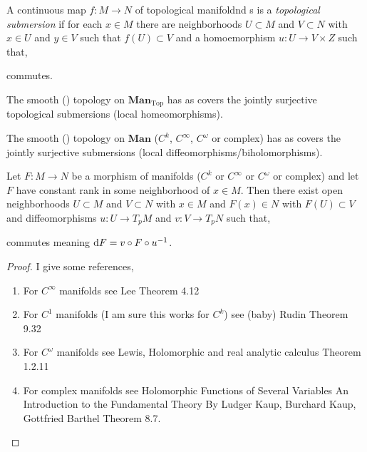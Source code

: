 \documentclass[12pt]{article}
\begin{document}
\begin{defn}
A continuous map $f : M \to N$ of topological manifoldnd s is a \textit{topological submersion} if for each $x \in M$ there are neighborhoods $U \subset M$ and $V \subset N$ with $x \in U$ and $y \in V$ such that $f(U) \subset V$ and a homoemorphism $u : U \to V \times Z$ such that,
\begin{center}
\end{center}
commutes.
\end{defn}

\begin{defn}
The smooth (\etale) topology on $\mathbf{Man}_{\mathrm{Top}}$ has as covers the jointly surjective topological submersions (local homeomorphisms). 
\end{defn}

\begin{defn}
The smooth (\etale) topology on $\mathbf{Man}$ ($C^k$, $C^\infty$, $C^\omega$ or complex) has as covers the jointly surjective submersions (local diffeomorphisms/biholomorphisms). 
\end{defn}

\begin{theorem}
Let $F : M \to N$ be a morphism of manifolds ($C^k$ or $C^\infty$ or $C^\omega$ or complex) and let $F$ have constant rank in some neighborhood of $x \in M$. Then there exist open neighborhoods $U \subset M$ and $V \subset N$ with $x \in M$ and $F(x) \in N$ with $F(U) \subset V$ and diffeomorphisms $u : U \to T_p M$ and $v : V \to T_p N$ such that,
\begin{center}
\end{center}
commutes meaning $\mathrm{d}{F} = v \circ F \circ u^{-1}$. 
\end{theorem}

\begin{proof}
I give some references,
\begin{enumerate}
\item For $C^\infty$ manifolds see Lee Theorem 4.12
\item For $C^1$ manifolds (I am sure this works for $C^k$) see (baby) Rudin Theorem 9.32
\item For $C^\omega$ manifolds see Lewis, Holomorphic and real analytic calculus Theorem 1.2.11
\item For complex manifolds see Holomorphic Functions of Several Variables
An Introduction to the Fundamental Theory
By Ludger Kaup, Burchard Kaup, Gottfried Barthel Theorem 8.7.
\end{enumerate}  
\end{proof}
\end{document}

